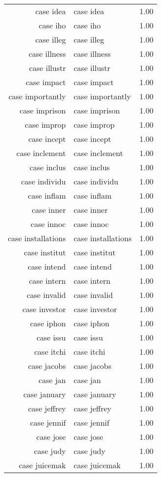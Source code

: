 \begin{table}[ht]
\begin{tabular}{rlr}
  case idea & case idea & 1.00 \\ 
  case iho & case iho & 1.00 \\ 
  case illeg & case illeg & 1.00 \\ 
  case illness & case illness & 1.00 \\ 
  case illustr & case illustr & 1.00 \\ 
  case impact & case impact & 1.00 \\ 
  case importantly & case importantly & 1.00 \\ 
  case imprison & case imprison & 1.00 \\ 
  case improp & case improp & 1.00 \\ 
  case incept & case incept & 1.00 \\ 
  case inclement & case inclement & 1.00 \\ 
  case inclus & case inclus & 1.00 \\ 
  case individu & case individu & 1.00 \\ 
  case inflam & case inflam & 1.00 \\ 
  case inner & case inner & 1.00 \\ 
  case innoc & case innoc & 1.00 \\ 
  case installations & case installations & 1.00 \\ 
  case institut & case institut & 1.00 \\ 
  case intend & case intend & 1.00 \\ 
  case intern & case intern & 1.00 \\ 
  case invalid & case invalid & 1.00 \\ 
  case investor & case investor & 1.00 \\ 
  case iphon & case iphon & 1.00 \\ 
  case issu & case issu & 1.00 \\ 
  case itchi & case itchi & 1.00 \\ 
  case jacobs & case jacobs & 1.00 \\ 
  case jan & case jan & 1.00 \\ 
  case january & case january & 1.00 \\ 
  case jeffrey & case jeffrey & 1.00 \\ 
  case jennif & case jennif & 1.00 \\ 
  case jose & case jose & 1.00 \\ 
  case judy & case judy & 1.00 \\ 
  case juicemak & case juicemak & 1.00 \\ 

\end{tabular}
\end{table}
